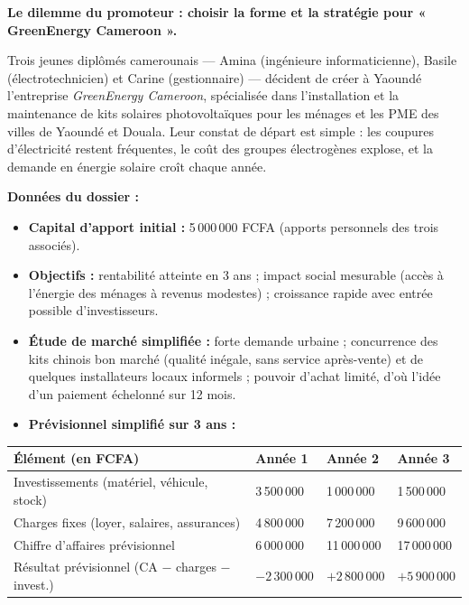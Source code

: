 \documentclass[11pt]{article}
\newcounter{popsec}
\newcounter{popsub}
\newcommand{\courssub}[1]{%
  \stepcounter{popsub}%
  \par\vspace{9pt}\noindent{\popxbold\fontsize{11.5}{13}\selectfont\color{popink}{\color{poporange}\thepopsec.\thepopsub}\hspace{6pt}#1}\par\nopagebreak\vspace{4pt}
}
\begin{document}
\courssub{Situation}

\textbf{Le dilemme du promoteur : choisir la forme et la stratégie pour « GreenEnergy Cameroon ».}

Trois jeunes diplômés camerounais — Amina (ingénieure informaticienne), Basile (électrotechnicien) et Carine (gestionnaire) — décident de créer à Yaoundé l'entreprise \emph{GreenEnergy Cameroon}, spécialisée dans l'installation et la maintenance de kits solaires photovoltaïques pour les ménages et les PME des villes de Yaoundé et Douala. Leur constat de départ est simple : les coupures d'électricité restent fréquentes, le coût des groupes électrogènes explose, et la demande en énergie solaire croît chaque année.

\textbf{Données du dossier :}

\begin{itemize}
\item \textbf{Capital d'apport initial :} 5\,000\,000 FCFA (apports personnels des trois associés).
\item \textbf{Objectifs :} rentabilité atteinte en 3 ans ; impact social mesurable (accès à l'énergie des ménages à revenus modestes) ; croissance rapide avec entrée possible d'investisseurs.
\item \textbf{Étude de marché simplifiée :} forte demande urbaine ; concurrence des kits chinois bon marché (qualité inégale, sans service après-vente) et de quelques installateurs locaux informels ; pouvoir d'achat limité, d'où l'idée d'un paiement échelonné sur 12 mois.
\item \textbf{Prévisionnel simplifié sur 3 ans :}
\end{itemize}

\begin{center}
\begin{tabularx}{\linewidth}{|l|X|X|X|}
\hline
\rowcolor{popblueL} \textbf{Élément (en FCFA)} & \textbf{Année 1} & \textbf{Année 2} & \textbf{Année 3} \\
\hline
Investissements (matériel, véhicule, stock) & 3\,500\,000 & 1\,000\,000 & 1\,500\,000 \\
\hline
Charges fixes (loyer, salaires, assurances) & 4\,800\,000 & 7\,200\,000 & 9\,600\,000 \\
\hline
Chiffre d'affaires prévisionnel & 6\,000\,000 & 11\,000\,000 & 17\,000\,000 \\
\hline
Résultat prévisionnel (CA $-$ charges $-$ invest.) & $-2\,300\,000$ & $+2\,800\,000$ & $+5\,900\,000$ \\
\hline
\end{tabularx}
\end{center}
\end{document}

